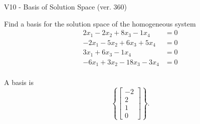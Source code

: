 \begin{exercise}
  \begin{exerciseTitle}V10 - Basis of Solution Space (ver. 360)\end{exerciseTitle}
  \begin{exerciseStatement}
    Find a basis for the solution space of the homogeneous system 
\begin{align*}
 2 x_ 1 -2 x_ 2 + 8 x_ 3 -1 x_ 4 &= 0  \\ 
  -2 x_ 1 -5 x_ 2 + 6 x_ 3 + 5 x_ 4 &= 0  \\ 
  3 x_ 1 + 6 x_ 3 -1 x_ 4 &= 0  \\ 
  -6 x_ 1 + 3 x_ 2 -18 x_ 3 -3 x_ 4 &= 0  \\ 
 \end{align*}


 
  \end{exerciseStatement}

  \begin{exerciseAnswer}
   A basis is   
\[\left\{\left[\begin{array}{c}
-2 \\
2 \\
1 \\
0
\end{array}\right]\right\}.\]

  


  \end{exerciseAnswer}
\end{exercise}